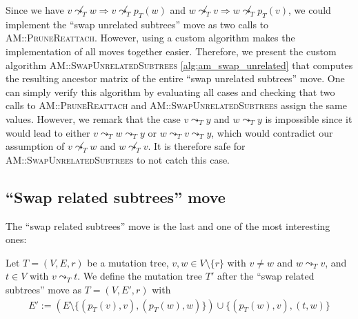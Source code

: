 Since we have $v \not\leadsto_T w \Rightarrow v \not\leadsto_T p_T(w)$ and $w \not\leadsto_T v \Rightarrow w \not\leadsto_T p_T(v)$, we could implement the ``swap unrelated subtrees'' move as two calls to \textsc{AM::PruneReattach}. However, using a custom algorithm makes the implementation of all moves together easier. Therefore, we present the custom algorithm \textsc{AM::SwapUnrelatedSubtrees} \ref{alg:am_swap_unrelated} that computes the resulting ancestor matrix of the entire ``swap unrelated subtrees'' move. One can simply verify this algorithm by evaluating all cases and checking that two calls to \textsc{AM::PruneReattach} and \textsc{AM::SwapUnrelatedSubtrees} assign the same values. However, we remark that the case $v \leadsto_T y$ and $w \leadsto_T y$ is impossible since it would lead to either $v \leadsto_T w \leadsto_T y$ or $w \leadsto_T v \leadsto_T y$, which would contradict our assumption of $v \not\leadsto_T w$ and $w \not\leadsto_T v$. It is therefore safe for \textsc{AM::SwapUnrelatedSubtrees} to not catch this case.

\subsection{``Swap related subtrees'' move}

The ``swap related subtrees'' move is the last and one of the most interesting ones:

\begin{definition}
    \label{def:swap_related_subtrees}
    Let $T = (V, E, r)$ be a mutation tree, $v, w \in V \setminus \{r\}$ with $v \neq w$ and $w \leadsto_T v$, and $t \in V$ with $v \leadsto_T t$. We define the mutation tree $T'$ after the ``swap related subtrees'' move as $T = (V, E', r)$ with
    \begin{align*}
        E' := (E \setminus \{(p_T(v), v), (p_T(w), w)\}) \cup \{(p_T(w), v), (t, w)\}
    \end{align*}
\end{definition}

